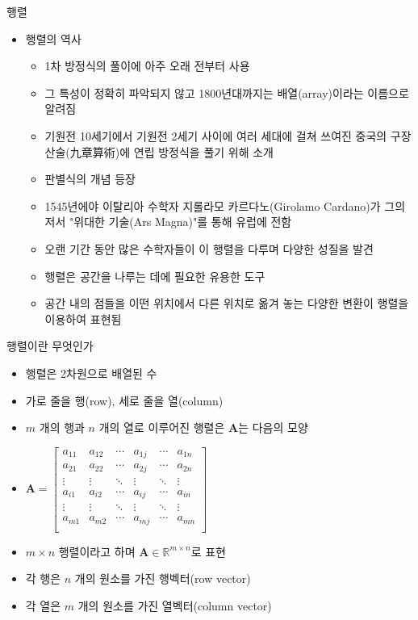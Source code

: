 \begin{frame}{행렬}

\begin{itemize}
\item 행렬의 역사
	\begin{itemize}
	\item 1차 방정식의 풀이에 아주 오래 전부터 사용
	\item 그 특성이 정확히 파악되지 않고 1800년대까지는 배열(array)이라는 이름으로 알려짐
	\item 기원전 10세기에서 기원전 2세기 사이에 여러 세대에 걸쳐 쓰여진 중국의 구장산술(九章算術)에 연립 방정식을 풀기 위해 소개
	\item 판별식의 개념 등장
	\item 1545년에야 이탈리아 수학자 지롤라모 카르다노(Girolamo Cardano)가 그의 저서 "위대한 기술(Ars Magna)"를 통해 유럽에 전함
	\item 오랜 기간 동안 많은 수학자들이 이 행렬을 다루며 다양한 성질을 발견
	\item 행렬은 공간을 나루는 데에 필요한 유용한 도구
	\item 공간 내의 점들을 이떤 위치에서 다른 위치로 옮겨 놓는 다양한 변환이 행렬을 이용하여 표현됨
	\end{itemize}
\end{itemize}

\end{frame}




\begin{frame}{행렬이란 무엇인가}

\begin{itemize}
\item 행렬은 2차원으로 배열된 수
\item 가로 줄을 행(row), 세로 줄을 열(column)
\item $m$ 개의 행과 $n$ 개의 열로 이루어진 행렬은 $\mathbf A$는 다음의 모양
\item $\mathbf A = \left [ 
\begin{array}{cccccc}
a_{11} & a_{12} & \cdots & a_{1j} & \cdots & a_{1n} \\
a_{21} & a_{22} & \cdots & a_{2j} & \cdots & a_{2n} \\
\vdots & \vdots & \ddots &   \vdots   & \ddots & \vdots \\
a_{i1} & a_{i2} & \cdots & a_{ij} & \cdots & a_{in} \\
\vdots & \vdots & \ddots & \vdots & \ddots & \vdots\\
a_{m1} & a_{m2} & \cdots & a_{mj} & \cdots & a_{mn} \\
\end{array}
\right ]$
\item $m \times n$ 행렬이라고 하며 $\mathbf A \in \mathbb R^{m\times n}$로 표현
\item 각 행은 $n$ 개의 원소를 가진 행벡터(row vector)
\item 각 열은 $m$ 개의 원소를 가진 열벡터(column vector)
\end{itemize}

\end{frame}


